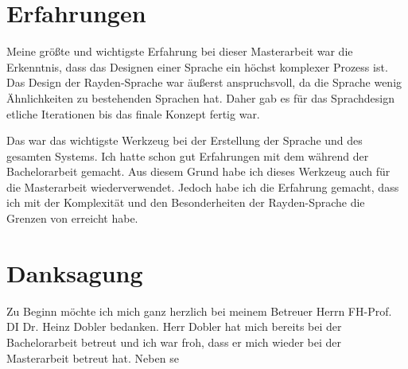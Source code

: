 \section{Erfahrungen}

Meine größte und wichtigste Erfahrung bei dieser Masterarbeit war die Erkenntnis, dass das Designen einer Sprache ein höchst komplexer Prozess ist. Das Design der Rayden-Sprache war äußerst anspruchsvoll, da die Sprache wenig Ähnlichkeiten zu bestehenden Sprachen hat. Daher gab es für das Sprachdesign etliche Iterationen bis das finale Konzept fertig war.

\SuperPar
Das  war das wichtigste Werkzeug bei der Erstellung der Sprache und des gesamten Systems. Ich hatte schon gut Erfahrungen mit dem  während der Bachelorarbeit gemacht. Aus diesem Grund habe ich dieses Werkzeug auch für die Masterarbeit wiederverwendet. Jedoch habe ich die Erfahrung gemacht, dass ich mit der Komplexität und den Besonderheiten der Rayden-Sprache die Grenzen von  erreicht habe.

\section{Danksagung}

Zu Beginn möchte ich mich ganz herzlich bei meinem Betreuer Herrn FH-Prof. DI Dr. Heinz Dobler bedanken. Herr Dobler hat mich bereits bei der Bachelorarbeit betreut und ich war froh, dass er mich wieder bei der Masterarbeit betreut hat. Neben se 






\todo
